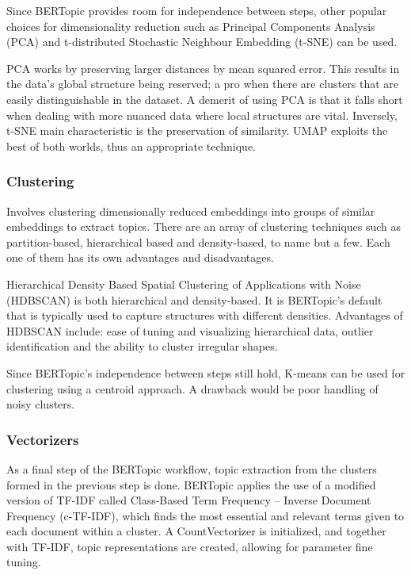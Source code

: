 \documentclass{article}
\theoremstyle{mytheoremstyle}
\theoremstyle{mytheoremstyle}
\theoremstyle{myproblemstyle}
\begin{document}
    Since BERTopic provides room for independence between steps, other popular choices for dimensionality reduction such as Principal Components Analysis (PCA) and t-distributed Stochastic Neighbour Embedding (t-SNE) can be used.

    PCA works by preserving larger distances by mean squared error. This results in the data's global structure being reserved; a pro when there are clusters that are easily distinguishable in the dataset. A demerit of using PCA is that it falls short when dealing with more nuanced data where local structures are vital. Inversely, t-SNE main characteristic is the preservation of similarity. UMAP exploits the best of both worlds, thus an appropriate technique.

    \subsubsection{Clustering}

    Involves clustering dimensionally reduced embeddings into groups of similar embeddings to extract topics. There are an array of clustering techniques such as partition-based, hierarchical based and density-based, to name but a few. Each one of them has its own advantages and disadvantages.

    Hierarchical Density Based Spatial Clustering of Applications with Noise (HDBSCAN) is both hierarchical and density-based. It is BERTopic's default that is typically used to capture structures with different densities. Advantages of HDBSCAN include: ease of tuning and visualizing hierarchical data, outlier identification and the ability to cluster irregular shapes. 

    Since BERTopic's independence between steps still hold, K-means can be used for clustering using a centroid approach. A drawback would be poor handling of noisy clusters.

    \subsubsection{Vectorizers}

    As a final step of the BERTopic workflow, topic extraction from the clusters formed in the previous step is done. BERTopic applies the use of a modified version of TF-IDF called Class-Based Term Frequency – Inverse Document Frequency (c-TF-IDF), which finds the most essential and relevant terms given to each document within a cluster. A CountVectorizer is initialized, and together with TF-IDF, topic representations are created, allowing for parameter fine tuning.
\end{document}
